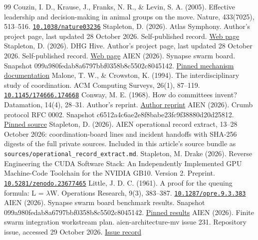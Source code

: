 \documentclass[11pt]{article}
\begin{document}
\begin{thebibliography}{99}
 Couzin, I. D., Krause, J., Franks, N. R., \& Levin, S. A. (2005). Effective leadership and decision-making in animal groups on the move. Nature, 433(7025), 513--516. \href{https://doi.org/10.1038/nature03236}{\nolinkurl{10.1038/nature03236}}
 Stapleton, D. (2026). Atlas Symphony. Author's project page, last updated 28 October 2026. Self-published record. \href{https://www.aienos.com/engineer/works/atlas-symphony/}{Web page}
 Stapleton, D. (2026). DHG Hive. Author's project page, last updated 28 October 2026. Self-published record. \href{https://www.aienos.com/engineer/works/dhg-hive/}{Web page}
 AIEN (2026). Synapse swarm board. Snapshot 099a980fedab8a6797bbf0358b8c5502c8045142. \href{https://github.com/aien-dev/synapse/blob/099a980fedab8a6797bbf0358b8c5502c8045142/docs/SWARM_BOARD.md}{Pinned mechanism documentation}
 Malone, T. W., \& Crowston, K. (1994). The interdisciplinary study of coordination. ACM Computing Surveys, 26(1), 87--119. \href{https://doi.org/10.1145/174666.174668}{\nolinkurl{10.1145/174666.174668}}
 Conway, M. E. (1968). How do committees invent? Datamation, 14(4), 28--31. Author's reprint. \href{https://www.melconway.com/Home/Committees_Paper.html}{Author reprint}
 AIEN (2026). Crumb protocol RFC 0002. Snapshot c6512a4c6ae2e8f8babe23fc9f38880d20d25812. \href{https://github.com/aien-dev/aien-architecture-mv/blob/c6512a4c6ae2e8f8babe23fc9f38880d20d25812/docs/CRUMB_PROTOCOL_RFC_0002.md}{Pinned source}
 Stapleton, D. (2026). AIEN operational record extract, 13--28 October 2026: coordination-board lines and incident handoffs with SHA-256 digests of the full private sources. Included in this article's source bundle as \nolinkurl{sources/operational_record_extract.md}.
 Stapleton, M. Drake (2026). Reverse Engineering the CUDA Software Stack: An Independently Implemented GPU Machine-Code Toolchain for the NVIDIA GB10. Version 2. Preprint. \href{https://doi.org/10.5281/zenodo.23677465}{\nolinkurl{10.5281/zenodo.23677465}}
 Little, J. D. C. (1961). A proof for the queuing formula: L = $\lambda$W. Operations Research, 9(3), 383--387. \href{https://doi.org/10.1287/opre.9.3.383}{\nolinkurl{10.1287/opre.9.3.383}}
 AIEN (2026). Synapse swarm board benchmark results. Snapshot 099a980fedab8a6797bbf0358b8c5502c8045142. \href{https://github.com/aien-dev/synapse/blob/099a980fedab8a6797bbf0358b8c5502c8045142/evidence/swarm-board/RESULTS.md}{Pinned results}
 AIEN (2026). Finite swarm integration workstream plan. aien-architecture-mv issue 231. Repository issue, accessed 29 October 2026. \href{https://github.com/aien-dev/aien-architecture-mv/issues/231}{Issue record}

\end{thebibliography}
\end{document}
